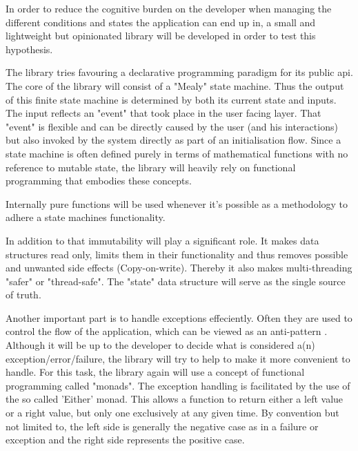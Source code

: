 




In order to reduce the cognitive burden on the developer when managing the different conditions and 
states the application can end up in, a small and lightweight but opinionated library will be developed
in order to test this hypothesis.

The library tries favouring a declarative programming paradigm for its public api.
The core of the library will consist of a "Mealy" state machine. 
Thus the output of this finite state machine is determined by both its current state and inputs.
The input reflects an "event" that took place in the user facing layer.
That "event" is flexible and can be directly caused by the user (and his interactions) but also invoked
by the system directly as part of an initialisation flow. %
Since a state machine is often defined purely in terms of mathematical functions with no reference to mutable state, 
the library will heavily rely on functional programming that embodies these concepts.

Internally pure functions will be used whenever it's possible as a methodology to adhere a state machines functionality.

In addition to that immutability will play a significant role. It makes data structures read only, limits them in their functionality 
and thus removes possible and unwanted side effects (Copy-on-write). Thereby it also makes multi-threading "safer" or "thread-safe".
The "state" data structure will serve as the single source of truth.

Another important part is to handle exceptions effeciently. Often they are used to control the flow of
the application, which can be viewed as an anti-pattern \cite{dontUseExceptionsForFlowControl}.
Although it will be up to the developer to decide what is considered a(n) exception/error/failure, 
the library will try to help to make it more convenient to handle.
For this task, the library again will use a concept of functional programming called "monads".
The exception handling is facilitated by the use of the so called 'Either' monad.
This allows a function to return either a left value or a right value, but only one exclusively at
any given time. By convention but not limited to, the left side is generally the negative case as in a failure or exception
and the right side represents the positive case.

